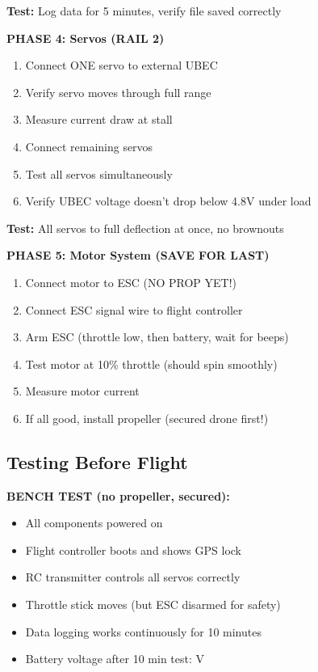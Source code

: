 \documentclass[11pt,letterpaper]{article}
\begin{document}
\textbf{Test:} Log data for 5 minutes, verify file saved correctly

\textbf{PHASE 4: Servos (RAIL 2)}
\begin{enumerate}
\item Connect ONE servo to external UBEC
\item Verify servo moves through full range
\item Measure current draw at stall
\item Connect remaining servos
\item Test all servos simultaneously
\item Verify UBEC voltage doesn't drop below 4.8V under load
\end{enumerate}

\textbf{Test:} All servos to full deflection at once, no brownouts

\textbf{PHASE 5: Motor System (SAVE FOR LAST)}
\begin{enumerate}
\item Connect motor to ESC (NO PROP YET!)
\item Connect ESC signal wire to flight controller
\item Arm ESC (throttle low, then battery, wait for beeps)
\item Test motor at 10\% throttle (should spin smoothly)
\item Measure motor current
\item If all good, install propeller (secured drone first!)
\end{enumerate}

\subsection{Testing Before Flight}

\textbf{BENCH TEST (no propeller, secured):}
\begin{itemize}[label=$\square$]
\item All components powered on
\item Flight controller boots and shows GPS lock
\item RC transmitter controls all servos correctly
\item Throttle stick moves (but ESC disarmed for safety)
\item Data logging works continuously for 10 minutes
\item Battery voltage after 10 min test: \underline{\hspace{2cm}} V
\end{itemize}
\end{document}
